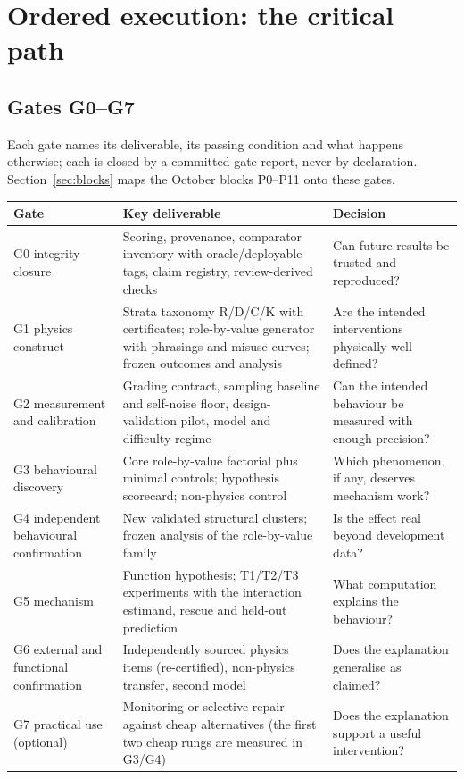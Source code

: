 \documentclass[10pt,a4paper]{article}
\begin{document}
\section{Ordered execution: the critical path}
\label{sec:execution}

\subsection{Gates G0--G7}
\label{sec:gates}

Each gate names its deliverable, its passing condition and what happens otherwise; each is closed by a committed
gate report, never by declaration. Section~\ref{sec:blocks} maps the October blocks P0--P11 onto these gates.

\begin{center}\small
\begin{tabularx}{\linewidth}{@{}P{3.4cm}LP{4.6cm}@{}}
\toprule
Gate & Key deliverable & Decision \\
\midrule
G0 integrity closure & Scoring, provenance, comparator inventory with oracle/deployable tags, claim registry, review-derived checks & Can future results be trusted and reproduced? \\
G1 physics construct & Strata taxonomy R/D/C/K with certificates; role-by-value generator with phrasings and misuse curves; frozen outcomes and analysis & Are the intended interventions physically well defined? \\
G2 measurement and calibration & Grading contract, sampling baseline and self-noise floor, design-validation pilot, model and difficulty regime & Can the intended behaviour be measured with enough precision? \\
G3 behavioural discovery & Core role-by-value factorial plus minimal controls; hypothesis scorecard; non-physics control & Which phenomenon, if any, deserves mechanism work? \\
G4 independent behavioural confirmation & New validated structural clusters; frozen analysis of the role-by-value family & Is the effect real beyond development data? \\
G5 mechanism & Function hypothesis; T1/T2/T3 experiments with the interaction estimand, rescue and held-out prediction & What computation explains the behaviour? \\
G6 external and functional confirmation & Independently sourced physics items (re-certified), non-physics transfer, second model & Does the explanation generalise as claimed? \\
G7 practical use (optional) & Monitoring or selective repair against cheap alternatives (the first two cheap rungs are measured in G3/G4) & Does the explanation support a useful intervention? \\
\bottomrule
\end{tabularx}
\end{center}
\end{document}
